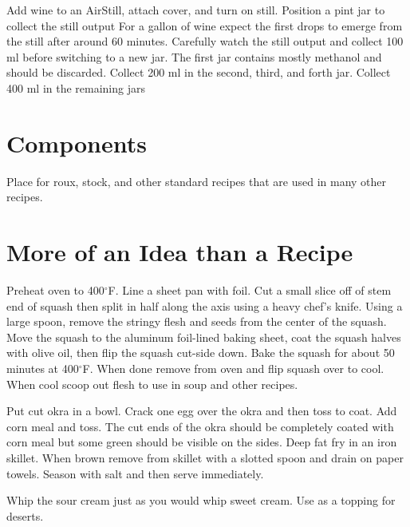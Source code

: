 \documentclass[letterpaper]{recipePMG}
\renewcommand{\deg}{$^\circ$}
\begin{document}
Add wine to an AirStill, attach cover, and turn on still. Position a pint jar to collect the still output For a gallon of wine expect the first drops to emerge from the still after around 60 minutes. Carefully watch the still output and collect 100 ml before switching to a new jar. The first jar contains mostly methanol and should be discarded. Collect 200 ml in the second, third, and forth jar. Collect 400 ml in the remaining jars

\chapter{Components}
Place for roux, stock, and other standard recipes that are used in many other recipes.

\chapter{  More of an Idea than a Recipe}



Preheat oven to 400\deg F.  Line a sheet pan with foil. Cut a small slice off of stem end of squash then split in half along the axis using a heavy chef's knife. Using a large spoon, remove the stringy flesh and seeds from the center of the squash.  Move the squash to the aluminum foil-lined baking sheet, coat the squash halves with olive oil, then flip the squash cut-side down. Bake the squash for about 50 minutes at 400\deg F. When done remove from oven and flip squash over to cool.  When cool scoop out flesh to use in soup and other recipes.



Put cut okra in a bowl. Crack one egg over the okra and then toss to coat. Add corn meal and toss.  The cut ends of the okra should be completely coated with corn meal but some green should be visible on the sides. Deep fat fry in an iron skillet. When brown remove from skillet with a slotted spoon and drain on paper towels. Season with salt and then serve immediately.



Whip the sour cream just as you would whip sweet cream.  Use as a topping for deserts.
\end{document}
